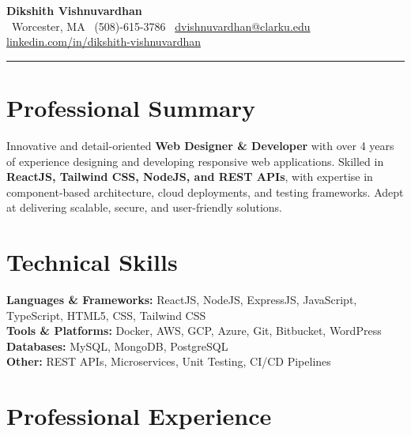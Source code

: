 \documentclass[a4paper,10pt]{article}
\begin{document}
\noindent
\textbf{\LARGE Dikshith Vishnuvardhan}\\
\noindent
\faMapMarker \, Worcester, MA \quad
\faPhone \, (508)-615-3786 \quad
\faEnvelope \, \href{mailto:dvishnuvardhan@clarku.edu}{dvishnuvardhan@clarku.edu} \quad
\faLinkedinSquare \, \href{https://linkedin.com/in/dikshith-vishnuvardhan}{linkedin.com/in/dikshith-vishnuvardhan}

\vspace{-10pt}
\noindent\rule{\textwidth}{0.5pt}

\section*{Professional Summary}
Innovative and detail-oriented \textbf{Web Designer \& Developer} with over 4 years of experience designing and developing responsive web applications. Skilled in \textbf{ReactJS, Tailwind CSS, NodeJS, and REST APIs}, with expertise in component-based architecture, cloud deployments, and testing frameworks. Adept at delivering scalable, secure, and user-friendly solutions.

\section*{Technical Skills}
\noindent
\textbf{Languages \& Frameworks:} ReactJS, NodeJS, ExpressJS, JavaScript, TypeScript, HTML5, CSS, Tailwind CSS\\
\textbf{Tools \& Platforms:} Docker, AWS, GCP, Azure, Git, Bitbucket, WordPress\\
\textbf{Databases:} MySQL, MongoDB, PostgreSQL\\
\textbf{Other:} REST APIs, Microservices, Unit Testing, CI/CD Pipelines

\section*{Professional Experience}
\end{document}
